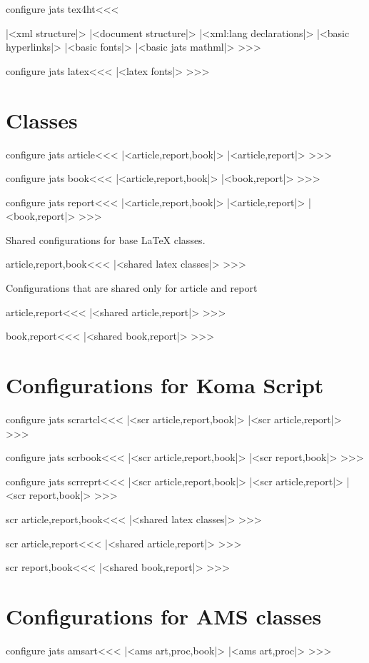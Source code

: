 \<configure jats tex4ht\><<<
|<xml structure|>
|<document structure|>
|<xml:lang declarations|>
|<basic hyperlinks|>
|<basic fonts|>
|<basic jats mathml|>
>>>

\<configure jats latex\><<<
|<latex fonts|>
>>>

\section{Classes}


\<configure jats article\><<<
|<article,report,book|>
|<article,report|>
>>>

\<configure jats book\><<<
|<article,report,book|>
|<book,report|>
>>>

\<configure jats report\><<<
|<article,report,book|>
|<article,report|>
|<book,report|>
>>>

Shared configurations for base LaTeX classes.

\<article,report,book\><<<
|<shared latex classes|>
>>>

Configurations that are shared only for article and report

\<article,report\><<<
|<shared article,report|>
>>>

\<book,report\><<<
|<shared book,report|>
>>>

\section{Configurations for Koma Script}

\<configure jats scrartcl\><<<
|<scr article,report,book|>
|<scr article,report|>
>>>

\<configure jats scrbook\><<<
|<scr article,report,book|>
|<scr report,book|>
>>>

\<configure jats scrreprt\><<<
|<scr article,report,book|>
|<scr article,report|>
|<scr report,book|>
>>>

\<scr article,report,book\><<<
|<shared latex classes|>
>>>

\<scr article,report\><<<
|<shared article,report|>
>>>

\<scr report,book\><<<
|<shared book,report|>
>>>

\section{Configurations for AMS classes}

\<configure jats amsart\><<<
|<ams art,proc,book|>
|<ams art,proc|>
>>>

